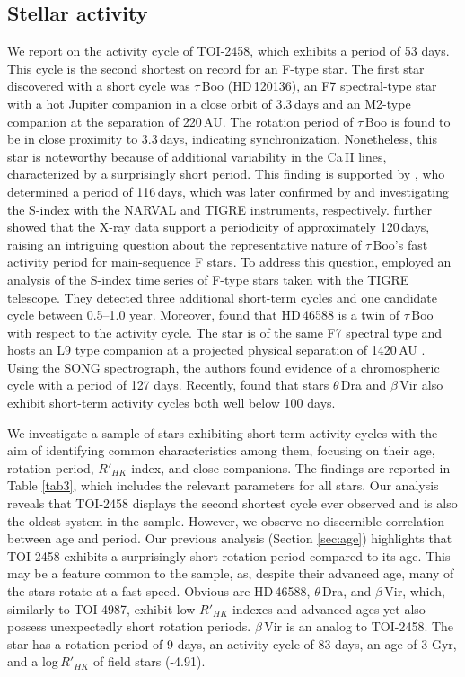 \documentclass[traditabstract,longauth]{aa}
\begin{document}
\subsection{Stellar activity}\label{sec:activity}

We report on the activity cycle of TOI-2458, which exhibits a period of 53 days. This cycle is the second shortest on record for an F-type star. The first star discovered with a short cycle was $\tau$\,Boo (HD\,120136), an F7 spectral-type star with a hot Jupiter companion in a close orbit of 3.3\,days and an M2-type companion at the separation of 220\,AU. The rotation period of $\tau$\,Boo is found to be in close proximity to 3.3\,days, indicating synchronization. Nonetheless, this star is noteworthy because of additional variability in the Ca\,{\small{II}} lines, characterized by a surprisingly short period. This finding is supported by \citet{Baliunas97}, who determined a period of 116\,days, which was later confirmed by \citet{Mengel16} and \citet{Mittag17} investigating the S-index with the NARVAL and TIGRE instruments, respectively. \citet{Mittag17} further showed that the X-ray data support a periodicity of approximately 120\,days, raising an intriguing question about the representative nature of $\tau$\,Boo's fast activity period for main-sequence F stars. To address this question, \citet{Mittag19} employed an analysis of the S-index time series of F-type stars taken with the TIGRE telescope. They detected three additional short-term cycles and one candidate cycle between 0.5--1.0 year. Moreover, \citet{Subjak23} found that HD\,46588 is a twin of $\tau$\,Boo with respect to the activity cycle. The star is of the same F7 spectral type and hosts an L9 type companion at a projected physical separation of 1420\,AU \citep{Loutrel11}. Using the SONG spectrograph, the authors found evidence of a chromospheric cycle with a period of 127 days. Recently, \citet{Seach22} found that stars $\theta$\,Dra and $\beta$\,Vir also exhibit short-term activity cycles both well below 100 days.

We investigate a sample of stars exhibiting short-term activity cycles with the aim of identifying common characteristics among them, focusing on their age, rotation period, $R'_{HK}$ index, and close companions. The findings are reported in Table \ref{tab3}, which includes the relevant parameters for all stars. Our analysis reveals that TOI-2458 displays the second shortest cycle ever observed and is also the oldest system in the sample. However, we observe no discernible correlation between age and period. Our previous analysis (Section \ref{sec:age}) highlights that TOI-2458 exhibits a surprisingly short rotation period compared to its age. This may be a feature common to the sample, as, despite their advanced age, many of the stars rotate at a fast speed. Obvious are HD\,46588, $\theta$\,Dra, and $\beta$\,Vir, which, similarly to TOI-4987, exhibit low $R'_{HK}$ indexes and advanced ages yet also possess unexpectedly short rotation periods. $\beta$\,Vir is an analog to TOI-2458. The star has a rotation period of 9 days, an activity cycle of 83 days, an age of 3 Gyr, and a log\,$R'_{HK}$ of field stars (-4.91).
\end{document}

